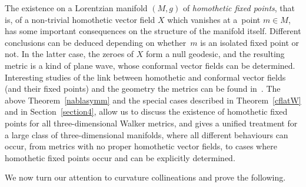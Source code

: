 \documentclass[pdftex]{sigma}
\numberwithin{equation}{section}
\begin{document}
\begin{Remark}
The existence on a Lorentzian manifold $(M,g)$ of {\em homothetic fixed points}, that is, of a non-trivial homothetic vector f\/ield $X$ which vanishes at a~point $m\in M$, has some important consequences on the structure of the manifold itself. Dif\/ferent conclusions can be deduced depending on whether~$m$ is an isolated f\/ixed point or not. In the latter case, the zeroes of $X$ form a null geodesic, and the resulting metric is a kind of plane wave, whose conformal vector f\/ields can be determined. Interesting studies of the link between homothetic and conformal vector f\/ields (and their f\/ixed points) and the geometry the metrics can be found in~\cite{Ale,Beem,HC,HLP}. The above Theorem~\ref{nablasymm} and the special cases described in Theorem~\ref{cflatW} and in Section~\ref{section4}, allow us to discuss the existence of homothetic f\/ixed points for all three-dimensional Walker metrics, and gives a unif\/ied treatment for a large class of three-dimensional manifolds, where all dif\/ferent behaviours can occur, from metrics with no proper homothetic vector f\/ields, to cases where homothetic f\/ixed points occur and can be explicitly determined.
\end{Remark}

We now turn our attention to curvature collineations and prove the following.
\end{document}
